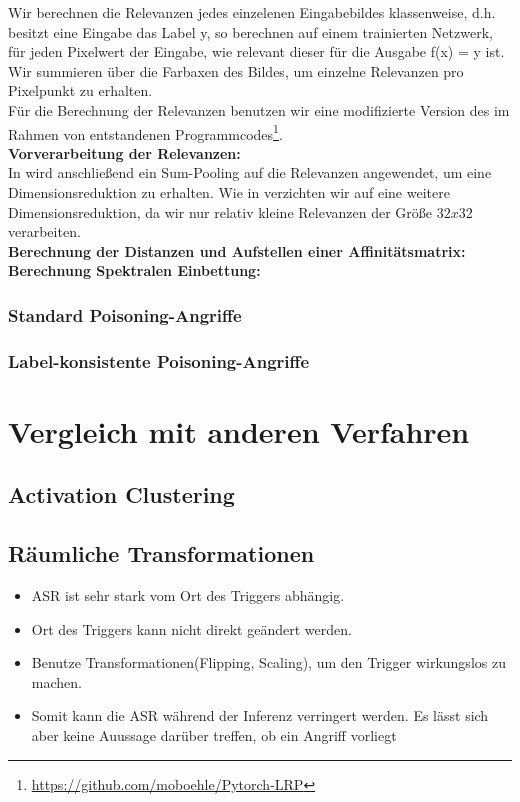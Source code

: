 \documentclass[twoside, 12pt,a4paper]{article}
\numberwithin{equation}{section}
\begin{document}
	\noindent Wir berechnen die Relevanzen jedes einzelenen Eingabebildes klassenweise, d.h. besitzt eine Eingabe das Label y, so berechnen auf einem trainierten Netzwerk, für jeden Pixelwert der Eingabe, wie relevant dieser für die Ausgabe f(x) = y ist.\\
	Wir summieren über die Farbaxen des Bildes, um einzelne Relevanzen pro Pixelpunkt zu erhalten.\\
	Für die Berechnung der Relevanzen benutzen wir eine modifizierte Version des im Rahmen von \cite{lrp_alzheimer} entstandenen Programmcodes\footnote{\url{https://github.com/moboehle/Pytorch-LRP}}.\\
	\noindent \textbf{Vorverarbeitung der Relevanzen:}\\
	In \cite{unmaskingCH} wird anschließend ein Sum-Pooling auf die Relevanzen angewendet, um eine Dimensionsreduktion zu erhalten. Wie in \cite{imagenet_unhansed_v1} verzichten wir auf eine weitere Dimensionsreduktion, da wir nur relativ kleine Relevanzen der Größe $32x32$ verarbeiten.	\\
	

	\noindent \textbf{Berechnung der Distanzen und Aufstellen einer Affinitätsmatrix:}\\
	
	
	\noindent \textbf{Berechnung Spektralen Einbettung:}\\
	
	\subsubsection{Standard Poisoning-Angriffe}
	\subsubsection{Label-konsistente Poisoning-Angriffe}
	\section{Vergleich mit anderen Verfahren} \label{chapter_comparisons}
	\subsection{Activation Clustering}
	\subsection{Räumliche Transformationen}
	\begin{itemize}
		\item ASR ist sehr stark vom Ort des Triggers abhängig.
		\item Ort des Triggers kann nicht direkt geändert werden.
		\item Benutze Transformationen(Flipping, Scaling), um den Trigger wirkungslos zu machen.
		\item Somit kann die ASR während der Inferenz verringert werden. Es lässt sich aber keine Auussage darüber treffen, ob ein Angriff vorliegt
	\end{itemize}
	
\end{document}
